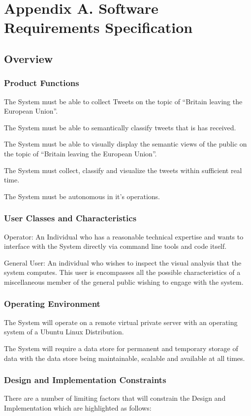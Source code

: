 \documentclass[11pt]{report}
\begin{document}
\chapter*{Appendix A. Software Requirements Specification}

\section*{Overview}
\subsection*{Product Functions}
The System must be able to collect Tweets on the topic of ``Britain leaving the European Union''.

The System must be able to semantically classify tweets that is has received.

The System must be able to visually display the semantic views of the public
on the topic of ``Britain leaving the European Union''.

The System must collect, classify and visualize the tweets within sufficient real time.

The System must be autonomous in it's operations.
\subsection*{User Classes and Characteristics}
Operator: An Individual who has a reasonable technical expertise and wants to interface with the System directly via command line tools and code itself.

General User: An individual who wishes to inspect the visual analysis that the system computes. This user is encompasses all the possible characteristics of a miscellaneous member of the general public wishing to engage with the system.

\subsection*{Operating Environment}
The System will operate on a remote virtual private server with an operating system of a Ubuntu Linux Distribution. 

The System will require a data store for permanent and temporary storage of data with the data store being maintainable, scalable and available at all times.

\subsection*{Design and Implementation Constraints}
There are a number of limiting factors that will constrain the Design and Implementation which are highlighted as follows:
\end{document}

